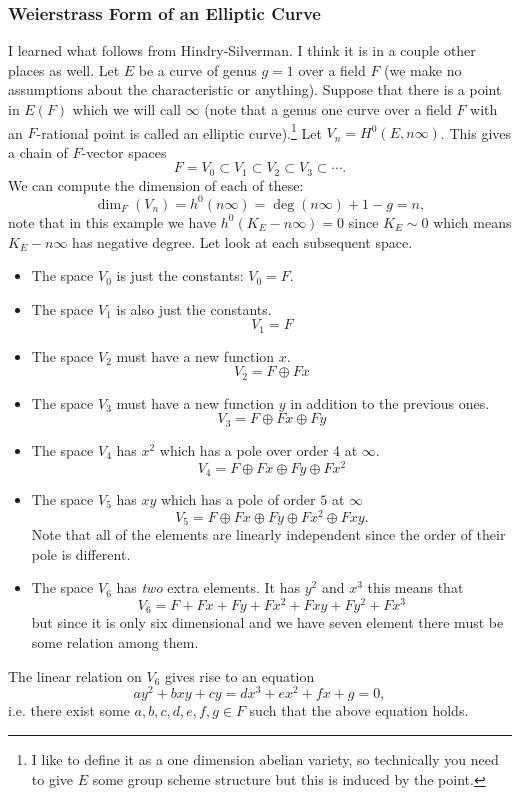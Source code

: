 \documentclass[12pt]{article}
\numberwithin{equation}{section}
\theoremstyle{definition}
\theoremstyle{remark}
\begin{document}
\subsubsection{Weierstrass Form of an Elliptic Curve}\label{S:weierstrass}
I learned what follows from Hindry-Silverman. I think it is in a couple other places as well.
Let $E$ be a curve of genus $g=1$ over a field $F$ (we make no assumptions about the characteristic or anything). 
Suppose that there is a point in $E(F)$ which we will call $\infty$ (note that a genus one curve over a field $F$ with an $F$-rational point is called an elliptic curve).\footnote{I like to define it as a one dimension abelian variety, so technically you need to give $E$ some group scheme structure but this is induced by the point.}
Let $V_n = H^0(E,n\infty)$. 
This gives a chain of $F$-vector spaces 
 $$ F=V_0 \subset V_1 \subset V_2 \subset V_3 \subset \cdots. $$
We can compute the dimension of each of these:
 $$ \dim_F(V_n) = h^0(n\infty) = \deg(n\infty)+1-g= n, $$
note that in this example we have $h^0(K_E-n\infty)=0$ since $K_E\sim 0$ which means $K_E-n\infty$ has negative degree.
Let look at each subsequent space.
\begin{itemize}
	\item The space $V_0$ is just the constants: $V_0=F$.
	\item The space $V_1$ is also just the constants.
	 $$ V_1=F$$
	\item The space $V_2$ must have a new function $x$.
	 $$ V_2 = F \oplus Fx $$
	\item The space $V_3$ must have a new function $y$ in addition to the previous ones.
	 $$ V_3 = F \oplus Fx \oplus Fy $$
	\item The space $V_4$ has $x^2$ which has a pole over order 4 at $\infty$.
	 $$ V_4 = F\oplus Fx \oplus Fy \oplus Fx^2 $$
	\item The space $V_5$ has $xy$ which has a pole of order $5$ at $\infty$
	$$V_5 = F\oplus Fx \oplus Fy \oplus Fx^2 \oplus Fxy. $$
	Note that all of the elements are linearly independent since the order of their pole is different.
	\item The space $V_6$ has \emph{two} extra elements. It has $y^2$ and $x^3$ this means that 
	$$ V_6 = F + Fx + Fy + Fx^2 + Fxy+ F y^2+Fx^3$$ 
	but since it is only six dimensional and we have seven element there must be some relation among them.
\end{itemize}
The linear relation on $V_6$ gives rise to an equation 
 $$ a y^2 + bxy+cy=dx^3+ex^2+fx+g=0,$$
i.e. there exist some $a,b,c,d,e,f,g\in F$ such that the above equation holds.
\end{document}
